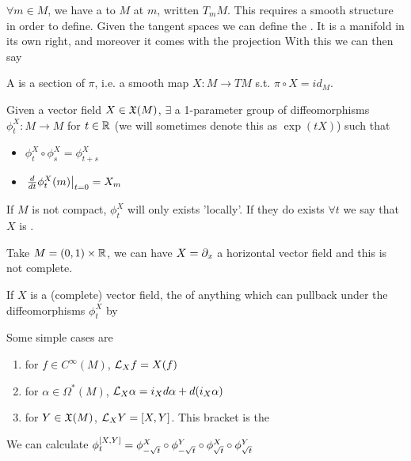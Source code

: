 \documentclass{article}
\begin{document}
$\forall m \in M$, we have a  to $M$ at $m$, written $T_m M$. This requires a smooth structure in order to define. Given the tangent spaces we can define 
the . It is a manifold in its own right, and moreover it comes with the projection 
With this we can then say
\begin{definition}
A  is a section of $\pi$, i.e. a smooth map $X:M \to TM$ s.t. $\pi \circ X = id_M$. 
\end{definition}


Given a vector field $X \in \mf{X}(M)$, $\exists$ a 1-parameter group of diffeomorphisms $\phi_t^X:M \to M$ for $t \in \mbb{R}$ (we will sometimes denote this as $\exp(tX)$) such that 
\begin{itemize}
	\item $\phi_t^X \circ \phi_s^X = \phi_{t+s}^X$
	\item $\ev{\frac{d}{dt} \phi_t^X(m)}{t=0} = X_m$
\end{itemize}

If $M$ is not compact, $\phi_t^X$ will only exists 'locally'. If they do exists $\forall t$ we say that $X$ is . 

\begin{example}
	Take $M = (0,1) \times \mbb{R}$, we can have $X = \del_x$ a horizontal vector field and this is not complete. 
\end{example}

\begin{definition}
	If $X$ is a (complete) vector field, the  of anything which can pullback under the diffeomorphisms $\phi_t^X$ by 
\end{definition}

\begin{example}
	Some simple cases are 
	\begin{enumerate}
		\item for $f \in C^\infty(M)$, $\mc{L}_X f = X(f)$
		\item for $\alpha \in \Omega^\ast(M)$, $\mc{L}_X \alpha = i_X d\alpha + d(i_X \alpha)$
		\item for $Y \in \mf{X}(M)$, $\mc{L}_X Y = \comm[X]{Y}$. This bracket is the 
	\end{enumerate}
\end{example}
\begin{lemma}
	We can calculate $\phi^{\comm[X]{Y}}_t = \phi^X_{-\sqrt{t}} \circ \phi^Y_{-\sqrt{t}} \circ \phi^X_{\sqrt{t}} \circ \phi^Y_{\sqrt{t}}$
\end{lemma}
\end{document}
